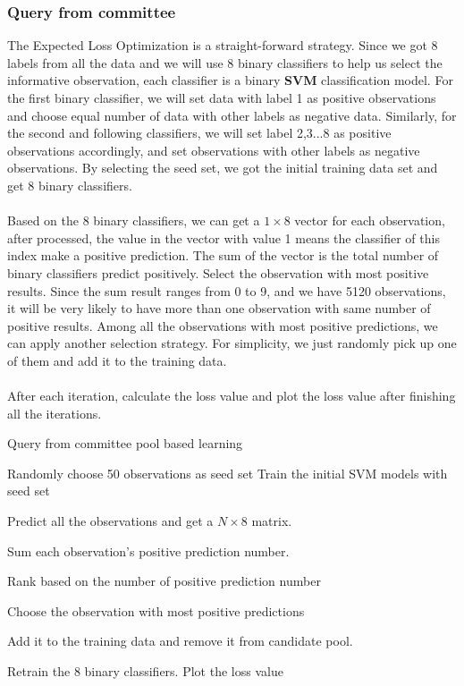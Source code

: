 \documentclass{article}
\begin{document}
\subsubsection{Query from committee}
The Expected Loss Optimization \cite{long2010active} is a straight-forward strategy. Since we got 8 labels from all the data and we will use 8 binary classifiers to help us select the informative observation, each classifier is a binary \textbf{SVM} classification model. For the first binary classifier, we will set data with label 1 as positive observations and choose equal number of data with other labels as negative data. Similarly, for the second and following classifiers, we will set label 2,3...8 as positive observations accordingly, and set observations with other labels as negative observations. By selecting the seed set, we got the initial training data set and get 8 binary classifiers.
\\
\\
Based on the 8 binary classifiers, we can get a $1\times 8$ vector for each observation, after processed, the value in the vector with value 1 means the classifier of this index make a positive prediction. The sum of the vector is the total number of binary classifiers predict positively. Select the observation with most positive results. Since the sum result ranges from 0 to 9, and we have 5120 observations, it will be very likely to have more than one observation with same number of positive results. Among all the observations with most positive predictions, we can apply another selection strategy. For simplicity, we just randomly pick up one of them and add it to the training data.
\\
\\
After each iteration, calculate the loss value and plot the loss value after finishing all the iterations.

\begin{algorithm}[H]
	\caption{Query from committee pool based learning}
	\begin{algorithmic}
		\State Randomly choose 50 observations as seed set
		\State Train the initial SVM models with seed set
		
			Predict all the observations and get a $N \times 8$ matrix.

			Sum each observation's positive prediction number.
			
			Rank based on the number of positive prediction number
			
			Choose the observation with most positive predictions
			
			Add it to the training data and remove it from candidate pool.
			
			Retrain the 8 binary classifiers.
		\EndWhile
	\State Plot the loss value
	\end{algorithmic}
\end{algorithm}
\end{document}
